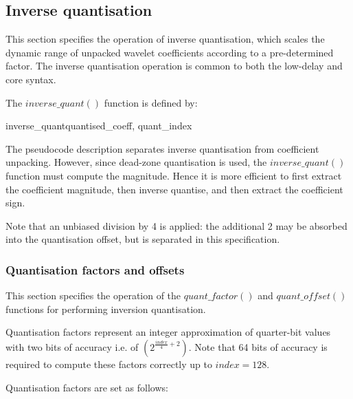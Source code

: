 \subsection{Inverse quantisation}
\label{invquant}

This section specifies the operation of inverse quantisation, which scales the
dynamic range of unpacked wavelet coefficients according to a pre-determined factor.
The inverse quantisation operation is common to both the low-delay and core syntax.

The $inverse\_quant()$ function is defined by:

\begin{pseudo}{inverse\_quant}{quantised\_coeff, quant\_index}
\bsEND
{}
\end{pseudo}

\begin{informative}
The pseudocode description separates inverse quantisation from coefficient unpacking. However, 
since dead-zone quantisation is used, the $inverse\_quant()$ function must compute
the magnitude. Hence it is more efficient to first extract the coefficient magnitude,
then inverse quantise, and then extract the coefficient sign. 

Note that an unbiased division by 4 is applied: the additional 2 may be absorbed into
the quantisation offset, but is separated in this specification.
\end{informative}

\subsubsection{Quantisation factors and offsets}
\label{quantfacs}

This section specifies the operation of the $quant\_factor()$ and 
$quant\_offset()$ functions for performing inversion quantisation.

Quantisation factors represent an integer approximation of quarter-bit values 
with two bits of accuracy i.e. of $(2^{\frac{index}{4}+2})$. Note that 64 bits 
of accuracy is required to compute these factors correctly up to $index=128$.

Quantisation factors are set as follows:

